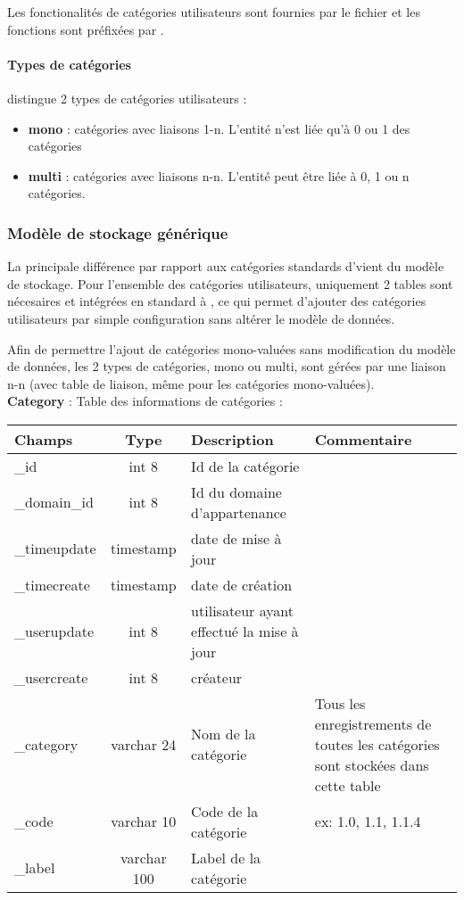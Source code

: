 Les fonctionalités de catégories utilisateurs sont fournies par le fichier  et les fonctions sont préfixées par .

\paragraph{Types de catégories}

\obm distingue 2 types de catégories utilisateurs :\\
\begin{itemize}
\item \textbf{mono} : catégories avec liaisons 1-n. L'entité n'est liée qu'à 0 ou 1 des catégories
\item \textbf{multi} : catégories avec liaisons n-n. L'entité peut être liée à 0, 1  ou n catégories.
\end{itemize}

\subsubsection{Modèle de stockage générique}

La principale différence par rapport aux catégories standards d'\obm vient du modèle de stockage.
Pour l'ensemble des catégories utilisateurs, uniquement 2 tables sont nécesaires et intégrées en standard à \obm, ce qui permet d'ajouter des catégories utilisateurs par simple configuration sans altérer le modèle de données.

Afin de permettre l'ajout de catégories mono-valuées sans modification du modèle de données, les 2 types de catégories, mono ou multi, sont gérées par une liaison n-n (avec table de liaison, même pour les catégories mono-valuées).\\

\textbf{Category} : Table des informations de catégories : \\

\begin{tabular}{|p{3cm}|c|p{4cm}|p{4cm}|}
\hline
\textbf{Champs} & \textbf{Type} & \textbf{Description} & \textbf{Commentaire} \\
\hline
\_id & int 8 & Id de la catégorie & \\
\hline
\_domain\_id & int 8 & Id du domaine d'appartenance & \\
\hline
\_timeupdate & timestamp & date de mise à jour & \\
\hline
\_timecreate & timestamp & date de création & \\
\hline
\_userupdate & int 8 & utilisateur ayant effectué la mise à jour & \\
\hline
\_usercreate & int 8 & créateur & \\
\hline
\_category & varchar 24 & Nom de la catégorie & Tous les enregistrements de toutes les catégories sont stockées dans cette table\\
\hline
\_code & varchar 10 & Code de la catégorie & ex: 1.0, 1.1, 1.1.4 \\
\hline
\_label & varchar 100 & Label de la catégorie & \\
\hline
\end{tabular}
\vspace{0.3cm}

